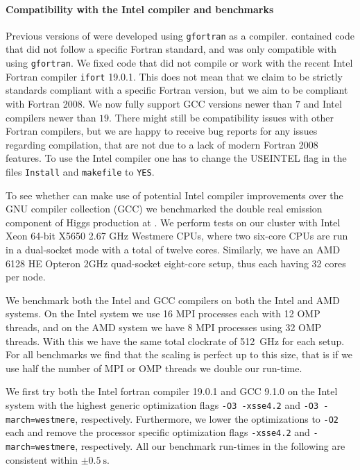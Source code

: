 \paragraph{Compatibility with the Intel compiler and benchmarks}

Previous versions of \MCFM{} were developed using \texttt{gfortran} as a compiler. \MCFM{} contained code that did not 
follow 
a specific Fortran standard, and was only compatible with using \texttt{gfortran}. We fixed code that did not compile 
or work with the recent Intel Fortran compiler \texttt{ifort} 19.0.1. This does not mean that we claim to be strictly 
standards 
compliant with a specific Fortran version, but we aim to be compliant with Fortran 2008. We now fully support GCC 
versions newer than $7$ and Intel compilers newer than $19$. There might still be compatibility issues with other 
Fortran compilers, but we are happy to receive bug reports for any issues regarding compilation, that are not due to a 
lack of modern Fortran 2008 features. To use the Intel compiler one has to change the USEINTEL flag in the files 
\texttt{Install} and \texttt{makefile}
to \texttt{YES}.

To see whether \MCFM{} can make use of potential Intel compiler improvements over the GNU compiler 
collection (GCC) we benchmarked 
the double
real emission component of Higgs production at \NNLO{}. We perform tests on our cluster with
Intel Xeon 64-bit X5650 2.67 GHz Westmere CPUs, where two six-core CPUs are run in a dual-socket mode with a total
of twelve cores. Similarly, we have an AMD 6128 HE Opteron 2GHz quad-socket eight-core setup, thus each having
32 cores per node.

We benchmark both the Intel and GCC compilers on both the Intel and AMD systems. On the Intel system we use 16 MPI 
processes each with 12 OMP threads, 
and on the AMD system we have 8 MPI processes using 32 OMP threads. With this we have the same total
clockrate of \SI{512}{GHz} for each setup. For all benchmarks we find that the scaling is perfect up to this size, that 
is if we use half the number of MPI or OMP threads we double our run-time.

We first try both the Intel fortran compiler 19.0.1 and GCC 9.1.0 on the Intel system with the highest generic
optimization flags \texttt{-O3 -xsse4.2} and \texttt{-O3 -march=westmere}, respectively. Furthermore,
we lower the optimizations to \texttt{-O2} each and remove the processor specific optimization flags
\texttt{-xsse4.2} and \texttt{-march=westmere}, respectively. All our benchmark run-times in the following are 
consistent
within $\pm \SI{0.5}{\s}$.

